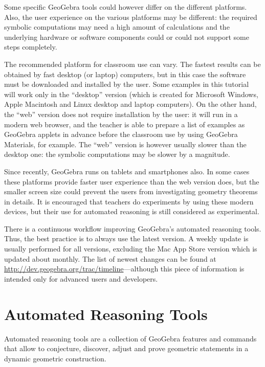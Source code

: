 \documentclass{article}
\begin{document}
Some specific GeoGebra tools could however differ on the different platforms. Also,  the user experience on the various platforms may be different: the required symbolic computations may need a high amount of calculations and the underlying hardware or software components could or could not support some steps completely.

The recommended platform for classroom use can vary. The fastest results can be obtained by fast desktop (or laptop) computers, but in this case the software must be downloaded and installed by the user. Some examples in this tutorial will work only in the ``desktop'' version (which is created for Microsoft Windows, Apple Macintosh and Linux desktop and laptop computers). On the other hand, the ``web'' version does not require installation by the user: it will run in a modern web browser, and the teacher is able to prepare a list of examples as GeoGebra applets in advance before the classroom use by using GeoGebra Materials, for example. The ``web'' version is however usually slower than the desktop one: the symbolic computations may be slower by a magnitude.

Since recently, GeoGebra runs on tablets and smartphones also. In some cases these platforms provide faster user experience than the web version does, but the smaller screen size could prevent the users from investigating geometry theorems in details. It is encouraged that teachers do experiments by using these modern devices, but their use for automated reasoning is still considered as experimental.

There is a continuous workflow improving GeoGebra's automated reasoning tools. Thus, the best practice is to always use the latest version. A weekly update is usually performed for all versions, excluding the Mac App Store version which is updated about monthly. The list of newest changes can be found at \url{http://dev.geogebra.org/trac/timeline}---although this piece of information is intended only for advanced users and developers.

\section{Automated Reasoning Tools}

Automated reasoning tools are a collection of GeoGebra features and commands that allow to conjecture, discover, adjust and prove geometric statements in a dynamic geometric construction.
\end{document}
